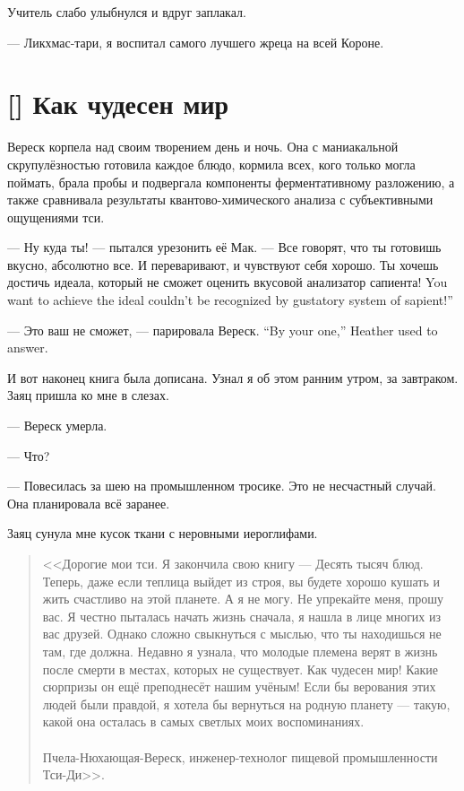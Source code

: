 Учитель слабо улыбнулся и вдруг заплакал.

--- Ликхмас-тари, я воспитал самого лучшего жреца на всей Короне.

\section{[] Как чудесен мир}

\textspace

Вереск корпела над своим творением день и ночь.
Она с маниакальной скрупулёзностью готовила каждое блюдо, кормила всех, кого только могла поймать, брала пробы и подвергала компоненты ферментативному разложению, а также сравнивала результаты квантово-химического анализа с субъективными ощущениями тси.

--- Ну куда ты! --- пытался урезонить её Мак.
--- Все говорят, что ты готовишь вкусно, абсолютно все.
И переваривают, и чувствуют себя хорошо.
{Ты хочешь достичь идеала, который не сможет оценить вкусовой анализатор сапиента!}
{You want to achieve the ideal couldn't be recognized by gustatory system of sapient!''}

{--- Это ваш не сможет, --- парировала Вереск.}
{``By your one,'' Heather used to answer.}

И вот наконец книга была дописана.
Узнал я об этом ранним утром, за завтраком.
Заяц пришла ко мне в слезах.

--- Вереск умерла.

--- Что?

--- Повесилась за шею на промышленном тросике.
Это не несчастный случай.
Она планировала всё заранее.

Заяц сунула мне кусок ткани с неровными иероглифами.

\begin{quote}
<<Дорогие мои тси.
Я закончила свою книгу --- Десять тысяч блюд.
Теперь, даже если теплица выйдет из строя, вы будете хорошо кушать и жить счастливо на этой планете.
А я не могу.
Не упрекайте меня, прошу вас.
Я честно пыталась начать жизнь сначала, я нашла в лице многих из вас друзей.
Однако сложно свыкнуться с мыслью, что ты находишься не там, где должна.
Недавно я узнала, что молодые племена верят в жизнь после смерти в местах, которых не существует.
Как чудесен мир!
Какие сюрпризы он ещё преподнесёт нашим учёным!
Если бы верования этих людей были правдой, я хотела бы вернуться на родную планету --- такую, какой она осталась в самых светлых моих воспоминаниях.\\~\\
Пчела-Нюхающая-Вереск, инженер-технолог пищевой промышленности Тси-Ди>>.
\end{quote}


